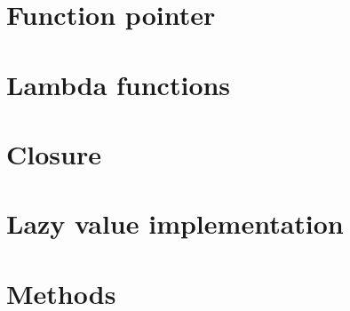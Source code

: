 \vfill%
\pagebreak

\section{Function pointer}
\label{sec:function_pointers}

\vfill%
\pagebreak

\section{Lambda functions}
\label{sec:lambda}

\vfill%
\pagebreak

\section{Closure}
\label{sec:closure}

\vfill%
\pagebreak

\section{Lazy value implementation}
\label{sec:impl_lazy_closure}


\vfill%
\pagebreak

\section{Methods}
\label{sec:method_delegates}
